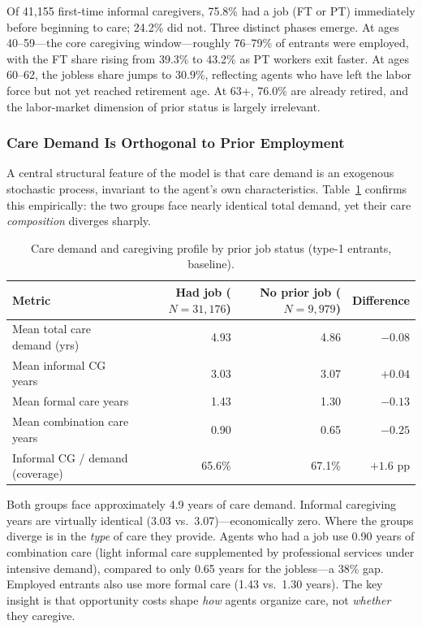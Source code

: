 Of 41,155 first-time informal caregivers, 75.8\% had a job (FT or PT) immediately before beginning to care; 24.2\% did not. Three distinct phases emerge. At ages 40--59---the core caregiving window---roughly 76--79\% of entrants were employed, with the FT share rising from 39.3\% to 43.2\% as PT workers exit faster. At ages 60--62, the jobless share jumps to 30.9\%, reflecting agents who have left the labor force but not yet reached retirement age. At 63+, 76.0\% are already retired, and the labor-market dimension of prior status is largely irrelevant.

\subsubsection{Care Demand Is Orthogonal to Prior Employment}

A central structural feature of the model is that care demand is an exogenous stochastic process, invariant to the agent's own characteristics. Table~\ref{tab:demand_by_prior_job} confirms this empirically: the two groups face nearly identical total demand, yet their care \textit{composition} diverges sharply.

\begin{table}[htbp]
  \centering
  \caption{Care demand and caregiving profile by prior job status (type-1 entrants, baseline).}
  \label{tab:demand_by_prior_job}
  \small
  \begin{tabular}{lrrr}
    \toprule
    Metric & Had job ($N{=}31{,}176$) & No prior job ($N{=}9{,}979$) & Difference \\
    \midrule
    Mean total care demand (yrs) & 4.93 & 4.86 & $-0.08$ \\
    Mean informal CG years & 3.03 & 3.07 & $+0.04$ \\
    Mean formal care years & 1.43 & 1.30 & $-0.13$ \\
    Mean combination care years & 0.90 & 0.65 & $-0.25$ \\
    Informal CG / demand (coverage) & 65.6\% & 67.1\% & $+1.6$ pp \\
    \bottomrule
  \end{tabular}
\end{table}

Both groups face approximately 4.9 years of care demand. Informal caregiving years are virtually identical (3.03 vs.\ 3.07)---economically zero. Where the groups diverge is in the \textit{type} of care they provide. Agents who had a job use 0.90 years of combination care (light informal care supplemented by professional services under intensive demand), compared to only 0.65 years for the jobless---a 38\% gap. Employed entrants also use more formal care (1.43 vs.\ 1.30 years). The key insight is that opportunity costs shape \textit{how} agents organize care, not \textit{whether} they caregive.

